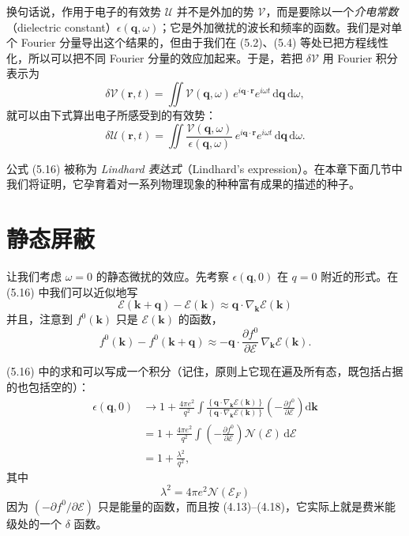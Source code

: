 换句话说，作用于电子的有效势 $\mathcal{U}$ 并不是外加的势 $\mathcal{V}$，而是要除以一个\emph{介电常数}（dielectric constant）$\epsilon(\mathbf{q},\omega)$；它是外加微扰的波长和频率的函数。我们是对单个 Fourier 分量导出这个结果的，但由于我们在 (5.2)、(5.4) 等处已把方程线性化，所以可以把不同 Fourier 分量的效应加起来。于是，若把 $\delta\mathcal{V}$ 用 Fourier 积分表示为
\begin{equation*}
\delta\mathcal{V}(\mathbf{r},t)=\iint\mathcal{V}(\mathbf{q},\omega)\,e^{i\mathbf{q}\cdot\mathbf{r}}e^{i\omega t}\,\mathrm{d}\mathbf{q}\,\mathrm{d}\omega,
\tag{5.17}
\end{equation*}
就可以由下式算出电子所感受到的有效势：
\begin{equation*}
\delta\mathcal{U}(\mathbf{r},t)=\iint\frac{\mathcal{V}(\mathbf{q},\omega)}{\epsilon(\mathbf{q},\omega)}\,e^{i\mathbf{q}\cdot\mathbf{r}}e^{i\omega t}\,\mathrm{d}\mathbf{q}\,\mathrm{d}\omega.
\tag{5.18}
\end{equation*}

公式 (5.16) 被称为 \emph{Lindhard 表达式}（Lindhard's expression）。在本章下面几节中我们将证明，它孕育着对一系列物理现象的种种富有成果的描述的种子。

\section{静态屏蔽}

让我们考虑 $\omega=0$ 的静态微扰的效应。先考察 $\epsilon(\mathbf{q},0)$ 在 $q=0$ 附近的形式。在 (5.16) 中我们可以近似地写
\begin{equation*}
\mathcal{E}(\mathbf{k}+\mathbf{q})-\mathcal{E}(\mathbf{k})\approx\mathbf{q}\cdot\nabla_{\mathbf{k}}\mathcal{E}(\mathbf{k})
\tag{5.19}
\end{equation*}
并且，注意到 $f^{0}(\mathbf{k})$ 只是 $\mathcal{E}(\mathbf{k})$ 的函数，
\begin{equation*}
f^{0}(\mathbf{k})-f^{0}(\mathbf{k}+\mathbf{q})\approx-\mathbf{q}\cdot\frac{\partial f^{0}}{\partial\mathcal{E}}\,\nabla_{\mathbf{k}}\mathcal{E}(\mathbf{k}).
\tag{5.20}
\end{equation*}

(5.16) 中的求和可以写成一个积分（记住，原则上它现在遍及所有态，既包括占据的也包括空的）：
\begin{align*}
\epsilon(\mathbf{q},0)&\to 1+\frac{4\pi e^{2}}{q^{2}}\int\frac{\left\{\mathbf{q}\cdot\nabla_{\mathbf{k}}\mathcal{E}(\mathbf{k})\right\}}{\left\{\mathbf{q}\cdot\nabla_{\mathbf{k}}\mathcal{E}(\mathbf{k})\right\}}\left(-\frac{\partial f^{0}}{\partial\mathcal{E}}\right)\mathrm{d}\mathbf{k}\\
&=1+\frac{4\pi e^{2}}{q^{2}}\int\left(-\frac{\partial f^{0}}{\partial\mathcal{E}}\right)\mathcal{N}(\mathcal{E})\,\mathrm{d}\mathcal{E}\\
&=1+\frac{\lambda^{2}}{q^{2}},
\tag{5.21}
\end{align*}
其中
\begin{equation*}
\lambda^{2}=4\pi e^{2}\mathcal{N}(\mathcal{E}_{F})
\tag{5.22}
\end{equation*}
因为 $\left(-\partial f^{0}/\partial\mathcal{E}\right)$ 只是能量的函数，而且按 (4.13)--(4.18)，它实际上就是费米能级处的一个 $\delta$ 函数。

